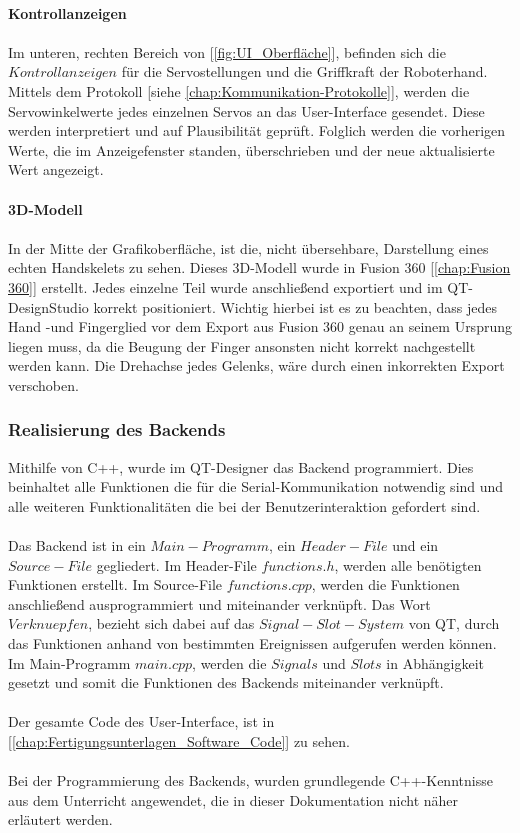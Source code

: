 \documentclass[titlepage,12pt,twoside]{article}
\begin{document}
\\
\textbf{Kontrollanzeigen} \\ 
\\
Im unteren, rechten Bereich von [\textcolor{blue}{\autoref{fig:UI_Oberfläche}}], befinden sich die $Kontrollanzeigen$ für die Servostellungen und die Griffkraft der Roboterhand. Mittels dem Protokoll [siehe \textcolor{blue}{\autoref{chap:Kommunikation-Protokolle}}], werden
die Servowinkelwerte jedes einzelnen Servos an das User-Interface gesendet. Diese werden interpretiert und auf Plausibilität geprüft. Folglich werden die vorherigen Werte, die im Anzeigefenster standen, überschrieben und der neue aktualisierte Wert angezeigt. \\
\\
\textbf{3D-Modell} \\
\\
In der Mitte der Grafikoberfläche, ist die, nicht übersehbare, Darstellung eines echten Handskelets zu sehen. Dieses 3D-Modell wurde in Fusion 360 [\textcolor{blue}{\autoref{chap:Fusion 360}}] erstellt. Jedes einzelne Teil wurde anschließend exportiert und im QT-DesignStudio korrekt positioniert. Wichtig
hierbei ist es zu beachten, dass jedes Hand -und Fingerglied vor dem Export aus Fusion 360 genau an seinem Ursprung liegen muss, da die Beugung der Finger ansonsten nicht korrekt nachgestellt werden kann. Die Drehachse jedes Gelenks, wäre durch einen inkorrekten Export
verschoben.  

\subsubsection{Realisierung des Backends}
Mithilfe von C++, wurde im QT-Designer das Backend programmiert. Dies beinhaltet alle Funktionen die für die Serial-Kommunikation notwendig sind und alle weiteren Funktionalitäten die bei der Benutzerinteraktion gefordert sind. \\
\\
Das Backend ist in ein $Main-Programm$, ein $Header-File$ und ein $Source-File$ gegliedert. Im Header-File $functions.h$, werden alle benötigten Funktionen erstellt. Im Source-File $functions.cpp$, werden die Funktionen anschließend 
ausprogrammiert und miteinander verknüpft. Das Wort $Verknuepfen$, bezieht sich dabei auf das $Signal-Slot-System$ von QT, durch das Funktionen anhand von bestimmten Ereignissen aufgerufen werden können. Im Main-Programm $main.cpp$, werden die $Signals$
und $Slots$ in Abhängigkeit gesetzt und somit die Funktionen des Backends miteinander verknüpft. \\
\\
Der gesamte Code des User-Interface, ist in [\textcolor{blue}{\autoref{chap:Fertigungsunterlagen_Software_Code}}] zu sehen. \\
\\
Bei der Programmierung des Backends, wurden grundlegende C++-Kenntnisse aus dem Unterricht angewendet, die in dieser Dokumentation nicht näher erläutert werden. \\
\\
\end{document}
